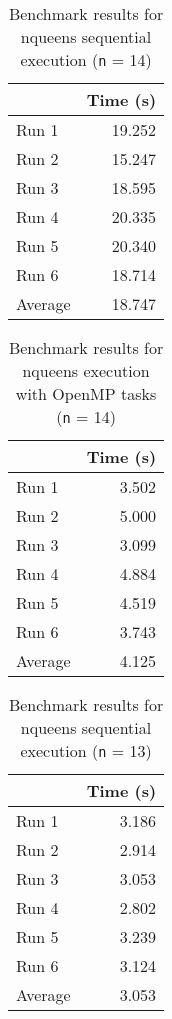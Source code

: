 \documentclass[12pt]{article}
\begin{document}
\begin{table}[H]
  \centering
  \begin{tabular}{lr}
    & {\bf Time (s)} \\
    \hline
    Run 1 & 19.252 \\
    Run 2 & 15.247 \\
    Run 3 & 18.595 \\
    Run 4 & 20.335 \\
    Run 5 & 20.340 \\
    Run 6 & 18.714 \\
    \hline
    Average & 18.747 \\
  \end{tabular}
  \caption{Benchmark results for nqueens sequential execution ({\tt n} = 14)}
  \label{tbl-fib-sequential}
\end{table}

\begin{table}[H]
  \centering
  \begin{tabular}{lr}
    & {\bf Time (s)} \\
    \hline
    Run 1 & 3.502 \\
    Run 2 & 5.000 \\
    Run 3 & 3.099 \\
    Run 4 & 4.884 \\
    Run 5 & 4.519 \\
    Run 6 & 3.743 \\
    \hline
    Average & 4.125 \\
  \end{tabular}
  \caption{Benchmark results for nqueens execution with OpenMP tasks ({\tt n} = 14)}
  \label{tbl-fib-tasks}
\end{table}
\begin{table}[H]
  \centering
  \begin{tabular}{lr}
    & {\bf Time (s)} \\
    \hline
    Run 1 & 3.186 \\
    Run 2 & 2.914 \\
    Run 3 & 3.053 \\
    Run 4 & 2.802 \\
    Run 5 & 3.239 \\
    Run 6 & 3.124 \\
    \hline
    Average & 3.053 \\
  \end{tabular}
  \caption{Benchmark results for nqueens sequential execution ({\tt n} = 13)}
  \label{tbl-fib-sequential}
\end{table}
\end{document}
